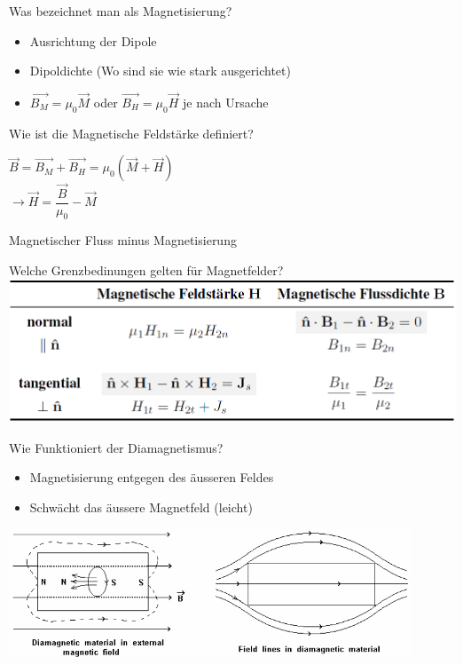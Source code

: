 \begin{karte}{Was bezeichnet man als Magnetisierung?}
	\begin{itemize}
		\item Ausrichtung der Dipole
		\item Dipoldichte (Wo sind sie wie stark ausgerichtet)
		\item $\vec{B_M} = \mu_{0} \vec{M}$ oder $\vec{B_H} = \mu_{0} \vec{H}$ je nach Ursache
	\end{itemize}
\end{karte}

\begin{karte}{Wie ist die Magnetische Feldstärke definiert?}
	\begin{center}
		\begin{huge}
			$\vec{B} = \vec{B_M}+ \vec{B_H}= \mu_0 \left(\vec{M} + \vec{H}\right)$\\
			$\rightarrow \vec{H} = \dfrac{\vec{B}}{\mu_0} - \vec{M}$\\
		\end{huge}
	\end{center}
	Magnetischer Fluss minus Magnetisierung
\end{karte}

\begin{karte}{Welche Grenzbedinungen gelten für Magnetfelder?}
	\flushleft \includegraphics[width=\textwidth]{pics/MS_Grenzbedinung.png}
\end{karte}

\begin{karte}{Wie Funktioniert der Diamagnetismus?}
	\begin{itemize}
		\item Magnetisierung entgegen des äusseren Feldes
		\item Schwächt das äussere Magnetfeld (leicht)
	\end{itemize}
	\includegraphics[width=0.9\textwidth]{pics/MS_Diamagnetismus.png}
\end{karte}

